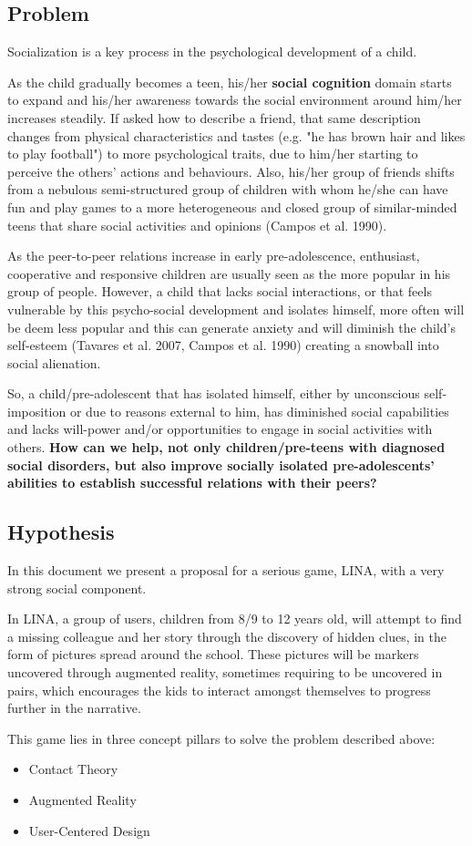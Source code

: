 \documentclass[runningheads]{llncs}
\begin{document}
\subsection{Problem}
Socialization is a key process in the psychological development of a child. 
\par As the child gradually becomes a teen, his/her \textbf{social cognition} domain starts to expand and his/her awareness towards the social environment around him/her increases steadily. If asked how to describe a friend, that same description changes from physical characteristics and tastes (e.g. "he has brown hair and likes to play football") to more psychological traits, due to him/her starting to perceive the others' actions and behaviours. Also, his/her group of friends shifts from a nebulous semi-structured group of children with whom he/she can have fun and play games to a more heterogeneous and closed group of similar-minded teens that share social activities and opinions (Campos et al. 1990). 
\par As the peer-to-peer relations increase in early pre-adolescence, enthusiast, cooperative and responsive children are usually seen as the more popular in his group of people. However, a child that lacks social interactions, or that feels vulnerable by this psycho-social development and isolates himself, more often will be deem less popular and this can generate anxiety and will diminish the child's self-esteem (Tavares et al. 2007, Campos et al. 1990) creating a snowball into social alienation.
\par So, a child/pre-adolescent that has isolated himself, either by unconscious self-imposition or due to reasons external to him, has diminished social capabilities and lacks will-power and/or opportunities to engage in social activities with others.  \textbf{How can we help, not only children/pre-teens with diagnosed social disorders, but also improve socially isolated pre-adolescents' abilities to establish successful relations with their peers?}

\subsection{Hypothesis}
\par In this document we present a proposal for a serious game, LINA, with a very strong social component. 
\par In LINA, a group of users, children from 8/9 to 12 years old, will attempt to find a missing colleague and her story through the discovery of hidden clues, in the form of pictures spread around the school. These pictures will be markers uncovered through augmented reality, sometimes requiring to be uncovered in pairs, which encourages the kids to interact amongst themselves to progress further in the narrative.  
\par This game lies in three concept pillars to solve the problem described above:
\begin{itemize}[noitemsep]
\item Contact Theory
\item Augmented Reality
\item User-Centered Design
\end{itemize}
\end{document}
